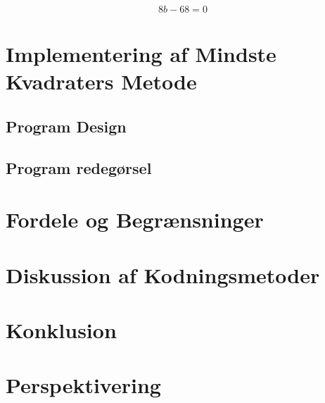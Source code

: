 \begin{equation*}
    8b - 68 = 0
\end{equation*}







\section{Implementering af Mindste Kvadraters Metode}


\subsection{Program Design}

\subsection{Program redegørsel}

\section{Fordele og Begrænsninger}

\section{Diskussion af Kodningsmetoder}

\section{Konklusion}

\section{Perspektivering}
